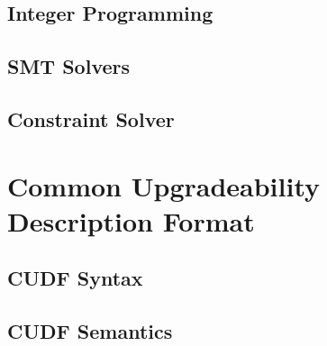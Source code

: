 \subsection{Integer Programming}
\subsection{SMT Solvers}
\subsection{Constraint Solver}

\section{Common Upgradeability Description Format}
{}\cite{treinen2009common}



\subsection{CUDF Syntax}




\subsection{CUDF Semantics}


